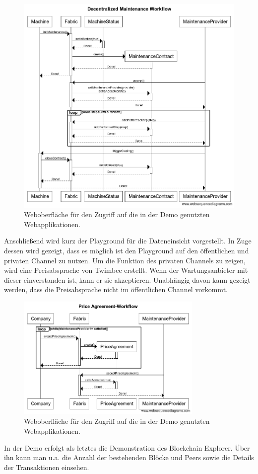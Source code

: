 \begin{figure}[htb]
    \centering
      \includegraphics[width=1.0\textwidth,angle=0]{images/maintenance-workflow}
       \caption{Weboberfläche für den Zugriff auf die in der Demo genutzten Webapplikationen.}
      \label{fig:maintenance-workflow}
\end{figure}

Anschließend wird kurz der Playground für die Dateneinsicht vorgestellt. In Zuge dessen wird gezeigt, dass es möglich ist den Playground auf den öffentlichen und privaten Channel zu nutzen. Um die Funktion des privaten Channels zu zeigen, wird eine Preisabsprache von Twimbee erstellt. Wenn der Wartungsanbieter mit dieser einverstanden ist, kann er sie akzeptieren. Unabhängig davon kann gezeigt werden, dass die Preisabsprache nicht im öffentlichen Channel vorkommt.

\begin{figure}[htb]
    \centering
      \includegraphics[width=0.8\textwidth,angle=0]{images/priceagreement-workflow}
       \caption{Weboberfläche für den Zugriff auf die in der Demo genutzten Webapplikationen.}
      \label{fig:images/priceagreement-workflow}
\end{figure}

In der Demo erfolgt als letztes die Demonstration des Blockchain Explorer. Über ihn kann man u.a. die Anzahl der bestehenden Blöcke und Peers sowie die Details der Transaktionen einsehen.









